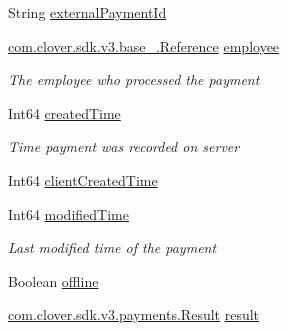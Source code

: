 \begin{DoxyCompactItemize}
String \hyperlink{classcom_1_1clover_1_1sdk_1_1v3_1_1payments_1_1_payment_afc446c973d90752e59a5d8ba34e6d169}{external\+Payment\+Id}
\item 
\hyperlink{classcom_1_1clover_1_1sdk_1_1v3_1_1base___1_1_reference}{com.\+clover.\+sdk.\+v3.\+base\+\_\+.\+Reference} \hyperlink{classcom_1_1clover_1_1sdk_1_1v3_1_1payments_1_1_payment_a9d11a012f89ae999fa4147b89499dd09}{employee}
\begin{DoxyCompactList}\small\item\em The employee who processed the payment \end{DoxyCompactList}\item 
Int64 \hyperlink{classcom_1_1clover_1_1sdk_1_1v3_1_1payments_1_1_payment_a900ea8c8b2091902f5bf38e8343ead00}{created\+Time}
\begin{DoxyCompactList}\small\item\em Time payment was recorded on server \end{DoxyCompactList}\item 
Int64 \hyperlink{classcom_1_1clover_1_1sdk_1_1v3_1_1payments_1_1_payment_aa9c2fecfc6a7df3caa188524a74da1fa}{client\+Created\+Time}
\item 
Int64 \hyperlink{classcom_1_1clover_1_1sdk_1_1v3_1_1payments_1_1_payment_a1ba3cec2bc2d9195c5df4bf0ccfeba90}{modified\+Time}
\begin{DoxyCompactList}\small\item\em Last modified time of the payment \end{DoxyCompactList}\item 
Boolean \hyperlink{classcom_1_1clover_1_1sdk_1_1v3_1_1payments_1_1_payment_a34801161ba730307156e5862cbe622f2}{offline}
\item 
\hyperlink{namespacecom_1_1clover_1_1sdk_1_1v3_1_1payments_ab493172d8abd5947fc0308d7cc311b2d}{com.\+clover.\+sdk.\+v3.\+payments.\+Result} \hyperlink{classcom_1_1clover_1_1sdk_1_1v3_1_1payments_1_1_payment_a40e0939245f119baf218d64521da4550}{result}

\end{DoxyCompactItemize}
